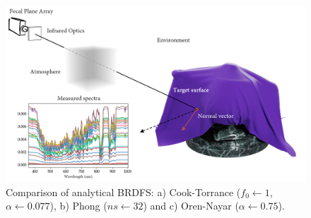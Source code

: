 \begin{figure}[!ht]
	\includegraphics[width=\textwidth]{figs/fundamentals/physic_principles.png}
	\caption{Comparison of analytical BRDFS: a) Cook-Torrance ($f_0 \gets 1$, $\alpha \gets 0.077$), b) Phong ($ns \gets 32$) and c) Oren-Nayar ($\alpha \gets 0.75$). }
    \label{fig:physic_principles}
\end{figure}

